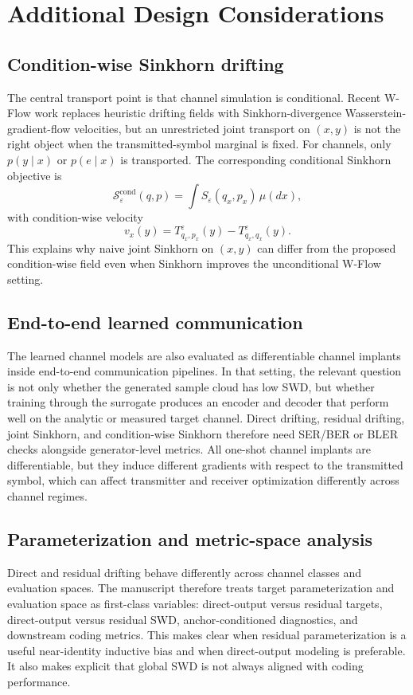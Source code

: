 \section{Additional Design Considerations}

\subsection{Condition-wise Sinkhorn drifting}
The central transport point is that channel simulation is conditional.
Recent W-Flow work replaces heuristic drifting fields with Sinkhorn-divergence Wasserstein-gradient-flow velocities, but an unrestricted joint transport on \((x,y)\) is not the right object when the transmitted-symbol marginal is fixed.
For channels, only \(p(y\mid x)\) or \(p(e\mid x)\) is transported.
The corresponding conditional Sinkhorn objective is
\[
\mathcal S_\varepsilon^{\mathrm{cond}}(q,p)=
\int S_\varepsilon(q_x,p_x)\,\mu(dx),
\]
with condition-wise velocity
\[
v_x(y)=T^\varepsilon_{q_x,p_x}(y)-T^\varepsilon_{q_x,q_x}(y).
\]
This explains why naive joint Sinkhorn on \((x,y)\) can differ from the proposed condition-wise field even when Sinkhorn improves the unconditional W-Flow setting.

\subsection{End-to-end learned communication}
The learned channel models are also evaluated as differentiable channel implants inside end-to-end communication pipelines.
In that setting, the relevant question is not only whether the generated sample cloud has low SWD, but whether training through the surrogate produces an encoder and decoder that perform well on the analytic or measured target channel.
Direct drifting, residual drifting, joint Sinkhorn, and condition-wise Sinkhorn therefore need SER/BER or BLER checks alongside generator-level metrics.
All one-shot channel implants are differentiable, but they induce different gradients with respect to the transmitted symbol, which can affect transmitter and receiver optimization differently across channel regimes.

\subsection{Parameterization and metric-space analysis}
Direct and residual drifting behave differently across channel classes and evaluation spaces.
The manuscript therefore treats target parameterization and evaluation space as first-class variables: direct-output versus residual targets, direct-output versus residual SWD, anchor-conditioned diagnostics, and downstream coding metrics.
This makes clear when residual parameterization is a useful near-identity inductive bias and when direct-output modeling is preferable.
It also makes explicit that global SWD is not always aligned with coding performance.

